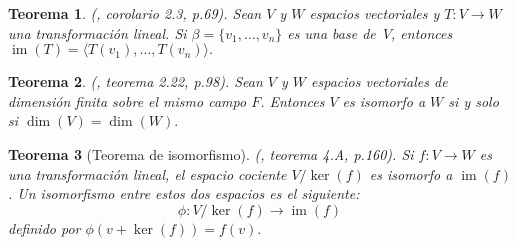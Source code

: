 \documentclass[12pt]{book}
\newtheorem{theorem}{Teorema}[section]
\theoremstyle{definition}
\newtheorem{definition}[theorem]{Definición}
\DeclareMathOperator{\im}{im}
\newcounter{in}
\newcounter{ini}
\begin{document}
\begin{theorem}{\normalfont (\cite{friedberg1982algebra}, corolario 2.3, p.69)}.
  \label{imT}
  Sean $V$ y $W$ espacios vectoriales y $T:V \rightarrow W$
  una transformación lineal. Si $\beta=\{v_{1},\ldots,v_{n}\}$ es una base de~$V$,
  entonces $\im(T)=\langle T(v_{1}),\ldots,T(v_{n})\rangle.$  
\end{theorem}

\begin{theorem}{\normalfont (\cite{friedberg1982algebra}, teorema 2.22, p.98)}.
  \label{esp-isomorfos}
  Sean $V$ y $W$ espacios vectoriales de dimensión finita sobre el
  mismo campo $F$. Entonces $V$ es isomorfo a $W$
  si y solo si $\dim (V)=\dim(W).$
\end{theorem}

\begin{theorem}[Teorema de isomorfismo]{\normalfont (\cite{herstein1990algebra}, teorema 4.A, p.160)}.
  \label{teorema-isomorfismo-esp}
  Si $f:V\rightarrow W$ es una transformación lineal, el espacio
  cociente $V/\ker(f)$ es isomorfo a $\im(f)$. Un isomorfismo entre estos dos
  espacios es el siguiente:
  $$\phi:V/\ker(f)\rightarrow \im(f)$$
  definido por $\phi(v+\ker(f))=f(v).$
\end{theorem}

\end{document}
